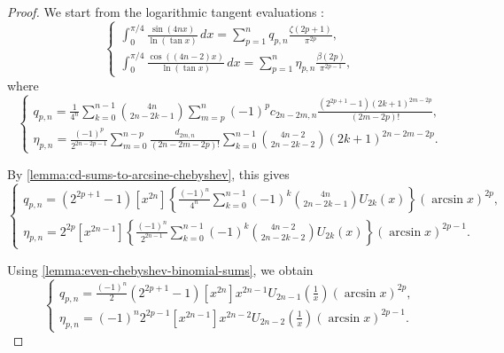 \documentclass[11pt,twoside]{article}
\numberwithin{equation}{section}
\begin{document}
\begin{proof}
We start from the logarithmic tangent evaluations
\cite{talla_waffo_integral_2025}:
\begin{equation}\label{eq:talla-waffo-logtan-start}
\begin{cases}
\displaystyle
\int_0^{\pi/4}
\frac{\sin(4nx)}{\ln(\tan x)}\,dx
=
\sum_{p=1}^{n}
q_{p,n}\frac{\zeta(2p+1)}{\pi^{2p}},
\\[2.4em]
\displaystyle
\int_0^{\pi/4}
\frac{\cos((4n-2)x)}{\ln(\tan x)}\,dx
=
\sum_{p=1}^{n}
\eta_{p,n}\frac{\beta(2p)}{\pi^{2p-1}},
\end{cases}
\end{equation}
where
\begin{equation}\label{eq:talla-waffo-logtan-coefficients}
\begin{cases}
\displaystyle
q_{p,n}
=
\frac{1}{4^n}
\sum_{k=0}^{n-1}
\binom{4n}{2n-2k-1}
\sum_{m=p}^{n}
(-1)^p c_{2n-2m,n}
\frac{(2^{2p+1}-1)(2k+1)^{2m-2p}}{(2m-2p)!},
\\[3.0em]
\displaystyle
\eta_{p,n}
=
\frac{(-1)^p}{2^{2n-2p-1}}
\sum_{m=0}^{n-p}
\frac{d_{2m,n}}{(2n-2m-2p)!}
\sum_{k=0}^{n-1}
\binom{4n-2}{2n-2k-2}
(2k+1)^{2n-2m-2p}.
\end{cases}
\end{equation}

By \cref{lemma:cd-sums-to-arcsine-chebyshev}, this gives
\begin{equation}\label{eq:logtan-coefficients-arcsine-step}
\begin{cases}
\displaystyle
q_{p,n}
=
(2^{2p+1}-1)
[x^{2n}]
\left\{
\frac{(-1)^n}{4^n}
\sum_{k=0}^{n-1}
(-1)^k
\binom{4n}{2n-2k-1}
U_{2k}(x)
\right\}
(\arcsin x)^{2p},
\\[3.0em]
\displaystyle
\eta_{p,n}
=
2^{2p}
[x^{2n-1}]
\left\{
\frac{(-1)^n}{2^{2n-1}}
\sum_{k=0}^{n-1}
(-1)^k
\binom{4n-2}{2n-2k-2}
U_{2k}(x)
\right\}
(\arcsin x)^{2p-1}.
\end{cases}
\end{equation}

Using \cref{lemma:even-chebyshev-binomial-sums}, we obtain
\begin{equation}\label{eq:logtan-coefficients-collapsed-step}
\begin{cases}
\displaystyle
q_{p,n}
=
\frac{(-1)^n}{2}
(2^{2p+1}-1)
[x^{2n}]
x^{2n-1}
U_{2n-1}\!\left(\frac1x\right)
(\arcsin x)^{2p},
\\[3.0em]
\displaystyle
\eta_{p,n}
=
(-1)^n2^{2p-1}
[x^{2n-1}]
x^{2n-2}
U_{2n-2}\!\left(\frac1x\right)
(\arcsin x)^{2p-1}.
\end{cases}
\end{equation}


\end{proof}
\end{document}
